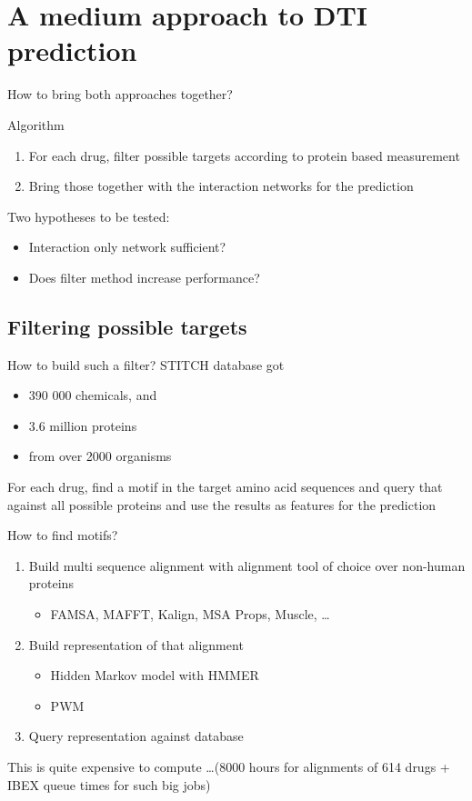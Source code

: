 \documentclass[10pt]{beamer}
\begin{document}
\section{A medium approach to DTI prediction}
\begin{frame}{How to bring both approaches together?}
	\begin{exampleblock}{Algorithm}
		\begin{enumerate}
			\item For each drug, filter possible targets according to protein based measurement
			\item Bring those together with the interaction networks for the prediction
		\end{enumerate}
	\end{exampleblock}
	\pause
	Two hypotheses to be tested:
	\begin{itemize}
		\item Interaction only network sufficient?
		\item Does filter method increase performance?
	\end{itemize}
\end{frame}

\subsection{Filtering possible targets}
\begin{frame}{How to build such a filter?}
	STITCH database got 
	\begin{itemize}
		\item 390 000 chemicals, and
		\item 3.6 million proteins
		\item from over 2000 organisms
	\end{itemize}
	\pause 
	\vspace{0.5cm}
	For each drug, find a motif in the target amino acid sequences and query that against all possible proteins and use the results as features for the prediction
\end{frame}

\begin{frame}{How to find motifs?}
	\begin{enumerate}
		\item Build multi sequence alignment with alignment tool of choice over non-human proteins
			\begin{itemize}
				\item FAMSA, MAFFT, Kalign, MSA Props, Muscle, \dots
			\end{itemize}
		\item Build representation of that alignment
			\begin{itemize}
				\item Hidden Markov model with HMMER
				\item PWM
			\end{itemize}
		\item Query representation against database
	\end{enumerate}
	\pause
	\vspace{0.5cm}
	This is quite expensive to compute \dots (8000 hours for alignments of 614 drugs + IBEX queue times for such big jobs)
\end{frame}
\end{document}
